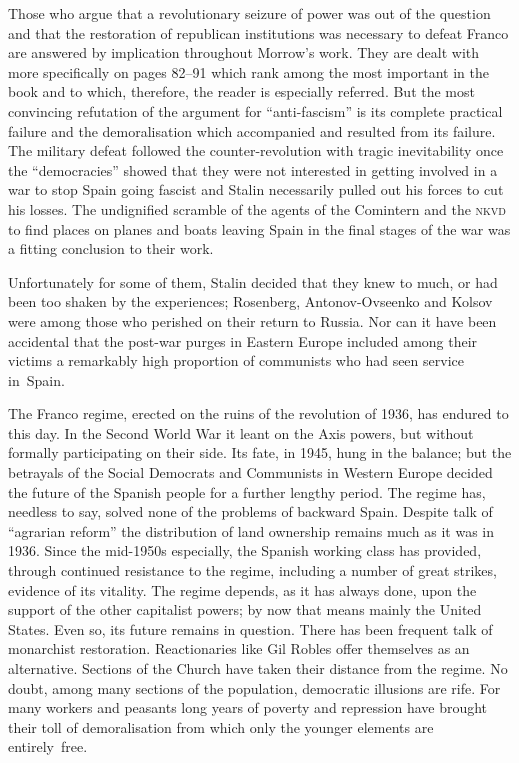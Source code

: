Those who argue that a revolutionary seizure of power was out of the question and that the restoration of republican institutions was necessary to defeat Franco are answered by implication throughout Morrow’s work. They are dealt with more specifically on pages 82--91 which rank among the most important in the book and to which, therefore, the reader is especially referred. But the most convincing refutation of the argument for ``anti-fascism'' is its complete practical failure and the demoralisation which accompanied and resulted from its failure. The military defeat followed the counter-revolution with tragic inevitability once the ``democracies'' showed that they were not interested in getting involved in a war to stop Spain going fascist and Stalin necessarily pulled out his forces to cut his losses. The undignified scramble of the agents of the Comintern and the \textsc{nkvd} to find places on planes and boats leaving Spain in the final stages of the war was a fitting conclusion to their work. 

Unfortunately for some of them, Stalin decided that they knew to much, or had been too shaken by the experiences; Rosenberg, Antonov-Ovseenko and Kolsov were among those who perished on their return to Russia. Nor can it have been accidental that the post-war purges in Eastern Europe included among their victims a remarkably high proportion of communists who had seen service in~Spain.

The Franco regime, erected on the ruins of the revolution of 1936, has endured to this day. In the Second World War it leant on the Axis powers, but without formally participating on their side. Its fate, in 1945, hung in the balance; but the betrayals of the Social Democrats and Communists in Western Europe decided the future of the Spanish people for a further lengthy period. The regime has, needless to say, solved none of the problems of backward Spain. Despite talk of ``agrarian reform'' the distribution of land ownership remains much as it was in 1936. Since the mid-1950s especially, the Spanish working class has provided, through continued resistance to the regime, including a number of great strikes, evidence of its vitality. The regime depends, as it has always done, upon the support of the other capitalist powers; by now that means mainly the United States. Even so, its future remains in question. There has been frequent talk of monarchist restoration. Reactionaries like Gil Robles{\indexGRobles} offer themselves as an alternative. Sections of the Church have taken their distance from the regime. No doubt, among many sections of the population, democratic illusions are rife. For many workers and peasants long years of poverty and repression have brought their toll of demoralisation from which only the younger elements are entirely~free.

